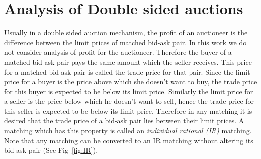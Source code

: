 \documentclass[a4paper,UKenglish,cleveref, autoref]{lipics-v2019}
\begin{document}
\begin{lemma}
\end{lemma}

\begin{lemma}
\end{lemma}

\section{Analysis of Double sided auctions}\label{sec:analysis}
Usually in a double sided auction mechanism, the profit of an auctioneer is the difference between the limit prices of matched bid-ask pair. In this work we do not consider analysis of profit for the auctioneer. Therefore the buyer of a matched bid-ask pair pays the same amount which the seller receives. This price for a matched  bid-ask pair is called the trade price for that pair. Since the limit price for a buyer is the price above which she doesn't want to buy, the trade price for this buyer is expected to be below its limit price. Similarly the limit price for a seller is the price below which he doesn't want to sell, hence the trade price for this seller is expected to be below its limit price. Therefore in any matching it is desired that the trade price of a bid-ask pair lies between their limit prices. A matching which has this property is called an \emph{individual rational (IR)} matching. Note that any matching can be converted to an IR matching without altering its bid-ask pair (See Fig~\ref{fig:IR}).
\end{document}
